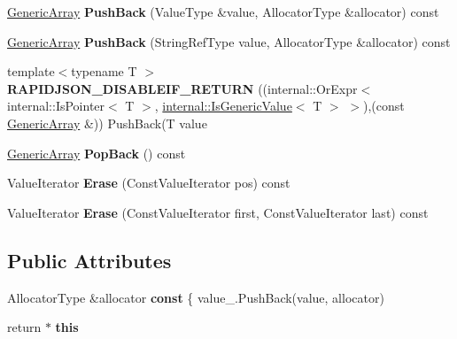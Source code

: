 \begin{DoxyCompactItemize}
\item 
\mbox{\label{classGenericArray_a2ed88f0630c044bad695a127a866c348}} 
\hyperlink{classGenericArray}{Generic\+Array} {\bfseries Push\+Back} (Value\+Type \&value, Allocator\+Type \&allocator) const
\item 
\mbox{\label{classGenericArray_ae599de6aee1167648085672b79dd6bcc}} 
\hyperlink{classGenericArray}{Generic\+Array} {\bfseries Push\+Back} (String\+Ref\+Type value, Allocator\+Type \&allocator) const
\item 
\mbox{\label{classGenericArray_a12adff0c1e11aa3be6f4160015a65df0}} 
{\footnotesize template$<$typename T $>$ }\\{\bfseries R\+A\+P\+I\+D\+J\+S\+O\+N\+\_\+\+D\+I\+S\+A\+B\+L\+E\+I\+F\+\_\+\+R\+E\+T\+U\+RN} ((internal\+::\+Or\+Expr$<$ internal\+::\+Is\+Pointer$<$ T $>$, \hyperlink{structinternal_1_1IsGenericValue}{internal\+::\+Is\+Generic\+Value}$<$ T $>$ $>$),(const \hyperlink{classGenericArray}{Generic\+Array} \&)) Push\+Back(T value
\item 
\mbox{\label{classGenericArray_afd1c75a82d2fc4366cde18256962edf6}} 
\hyperlink{classGenericArray}{Generic\+Array} {\bfseries Pop\+Back} () const
\item 
\mbox{\label{classGenericArray_aefa57a363accf2ade867583771f8a54b}} 
Value\+Iterator {\bfseries Erase} (Const\+Value\+Iterator pos) const
\item 
\mbox{\label{classGenericArray_ac1be0c701ad3aaf0570a8a1ffc715fd5}} 
Value\+Iterator {\bfseries Erase} (Const\+Value\+Iterator first, Const\+Value\+Iterator last) const
\end{DoxyCompactItemize}
\subsection*{Public Attributes}
\begin{DoxyCompactItemize}
\item 
\mbox{\label{classGenericArray_a25d2ed55daa117c41db6a5b3f87e9ddc}} 
Allocator\+Type \&allocator {\bfseries const} \{ value\+\_\+.\+Push\+Back(value, allocator)
\item 
\mbox{\label{classGenericArray_aef8b7baa9ec5cd68d8951fa8bad85217}} 
return $\ast$ {\bfseries this}
\end{DoxyCompactItemize}
